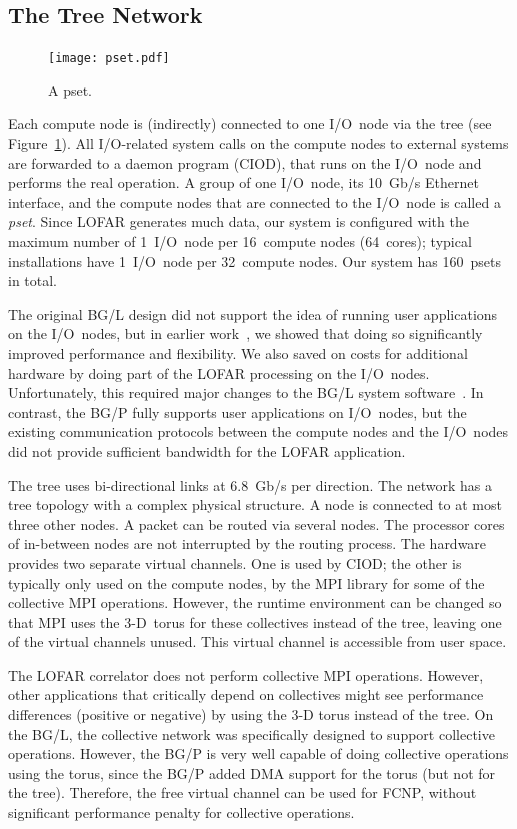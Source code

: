\documentclass[journal]{IEEEtran}
\begin{document}
\subsection{The Tree Network}

\begin{figure}[h]
\texttt{[image: pset.pdf]}
\caption{A pset.}
\label{fig:pset}
\end{figure}

Each compute node is (indirectly) connected to one I/O~node via the tree
(see Figure~\ref{fig:pset}).
All I/O-related system calls on the compute nodes to external systems are
forwarded to a daemon program (CIOD), that runs on the
I/O~node and performs the real operation.
A group of one I/O~node, its 10~Gb/s Ethernet interface, and the compute
nodes that are connected to the I/O~node is called a \emph{pset}.
Since LOFAR generates much data, our system is configured with
the maximum number of 1~I/O~node per 16~compute nodes (64~cores); typical
installations have 1~I/O~node per 32~compute nodes.
Our system has 160~psets in total.

The original BG/L design did not support the idea of running user applications
on the I/O~nodes, but in earlier work~\cite{Iskra:08}, we showed that doing so 
significantly improved performance and flexibility.
We also saved on costs for additional hardware by doing part of the LOFAR
processing on the I/O~nodes.
Unfortunately, this required major changes to the BG/L system
software~\cite{Iskra:08,Boonstoppel:08}.
In contrast, the BG/P fully supports user applications on I/O~nodes, but
the existing communication protocols between the compute nodes and the
I/O~nodes did not provide sufficient bandwidth for the LOFAR application.

The tree uses bi-directional links at 6.8~Gb/s per direction.
The network has a tree topology with a complex physical structure.
A node is connected to at most three other nodes.
A packet can be routed via several nodes.
The processor cores of in-between nodes are not interrupted by the routing
process.
The hardware provides two separate virtual channels.
One is used by CIOD;
the other is typically only used on the compute nodes, by the MPI library for
some of the collective MPI operations.
However, the runtime environment can be changed so that MPI uses the
3-D~torus for these collectives instead of the tree, leaving one of the virtual
channels unused.
This virtual channel is accessible from user space.

The LOFAR correlator does not perform collective MPI operations.
However, other applications that critically depend on collectives might
see performance differences (positive or negative) by using the 3-D torus
instead of the tree.
On the BG/L, the collective network was specifically designed to
support collective operations.
However, the BG/P is very well capable of doing collective operations
using the torus, since the BG/P added DMA support for the torus
(but not for the tree).
Therefore, the free virtual channel can be used for FCNP, without
significant performance penalty for collective operations.
\end{document}

